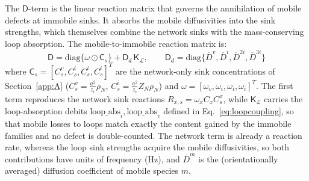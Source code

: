 \documentclass{article}
\newcommand{\spvec}[1]{\bm{\mathsf{#1}}}   %
\newcommand{\spmat}[1]{\bm{\mathsf{#1}}}   %
\begin{document}
The $\spmat{D}$-term is the linear reaction matrix that governs the annihilation of mobile defects at immobile sinks. It absorbs the mobile diffusivities into the sink strengths, which themselves combine the network sinks with the mass-conserving loop absorption. The mobile-to-immobile reaction matrix is:
\begin{equation}\label{eq:KM}
\spmat{D}=\mathrm{diag}\{\spvec{\omega}\odot\spvec{C}_s\}+\spmat{D}_d\,\spmat{K}_{\mathcal L},\qquad
\spmat{D}_d=\mathrm{diag}\{\overline{D}^v,\overline{D}^i,\overline{D}^{2i},\overline{D}^{3i}\} 
\end{equation}
where $\spvec{C}_s=[C_s^v,C_s^i,C_s^i,C_s^i]^T$ are the network-only sink concentrations of Section~\ref{app:A} ($C_s^v=\tfrac{a^2}{z_c}\rho_N$, $C_s^i=\tfrac{a^2}{z_c}Z_N\rho_N$) and $\spvec{\omega}=[\omega_v,\omega_i,\omega_i,\omega_i]^T$. The first term reproduces the network sink reactions $R_{x,s}=\omega_x C_x C_s^x$, while $\spmat{K}_{\mathcal L}$ carries the loop-absorption debits $\text{loop\_abs}_i,\text{loop\_abs}_v$ defined in Eq.~\eqref{eq:loopcoupling}, so that mobile losses to loops match exactly the content gained by the immobile families and no defect is double-counted. The network term is already a reaction rate, whereas the loop sink strengths acquire the mobile diffusivities, so both contributions have units of frequency (Hz), and $\overline{D}^m$ is the (orientationally averaged) diffusion coefficient of mobile species $m$.
\end{document}
